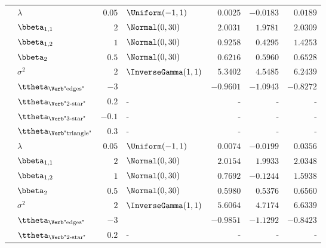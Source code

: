 \begin{table}[t]
\begin{tabular}{cl|rlrrr}
        & $\lambda$                          & $0.05$ & $\Uniform(-1,1)$       & $0.0025$  & $-0.0183$ & $0.0189$  \\
        & $\bbeta_{1,1}$                     & $2$    & $\Normal(0,30)$        & $2.0031$  & $1.9781$  & $2.0309$  \\
        & $\bbeta_{1,2}$                     & $1$    & $\Normal(0,30)$        & $0.9258$  & $0.4295$  & $1.4253$  \\
        & $\bbeta_{2}$                       & $0.5$  & $\Normal(0,30)$        & $0.6216$  & $0.5960$  & $0.6528$  \\
        & $\sigma^2$                         & $2$    & $\InverseGamma(1,1)$   & $5.3402$  & $4.5485$  & $6.2439$  \\
        & $\ttheta_{\text{\Verb"edges"}}$    & $-3$   &  & $-0.9601$ & $-1.0943$ & $-0.8272$ \\
        & $\ttheta_{\text{\Verb"2-star"}}$   & $0.2$  & -                      & -         & -         & -         \\
        & $\ttheta_{\text{\Verb"3-star"}}$   & $-0.1$ & -                      & -         & -         & -         \\
        & $\ttheta_{\text{\Verb"triangle"}}$ & $0.3$  & -                      & -         & -         & -         \\
		\midrule
        & $\lambda$                          & $0.05$ & $\Uniform(-1,1)$       & $0.0074$  & $-0.0199$ & $0.0356$  \\
        & $\bbeta_{1,1}$                     & $2$    & $\Normal(0,30)$        & $2.0154$  & $1.9933$  & $2.0348$  \\
        & $\bbeta_{1,2}$                     & $1$    & $\Normal(0,30)$        & $0.7692$  & $-0.1244$ & $1.5938$  \\
        & $\bbeta_{2}$                       & $0.5$  & $\Normal(0,30)$        & $0.5980$  & $0.5376$  & $0.6560$  \\
        & $\sigma^2$                         & $2$    & $\InverseGamma(1,1)$   & $5.6064$  & $4.7174$  & $6.6339$  \\
        & $\ttheta_{\text{\Verb"edges"}}$    & $-3$   &  & $-0.9851$ & $-1.1292$ & $-0.8423$ \\
        & $\ttheta_{\text{\Verb"2-star"}}$   & $0.2$  & -                      & -         & -         & -         \\

\end{tabular}
\end{table}
